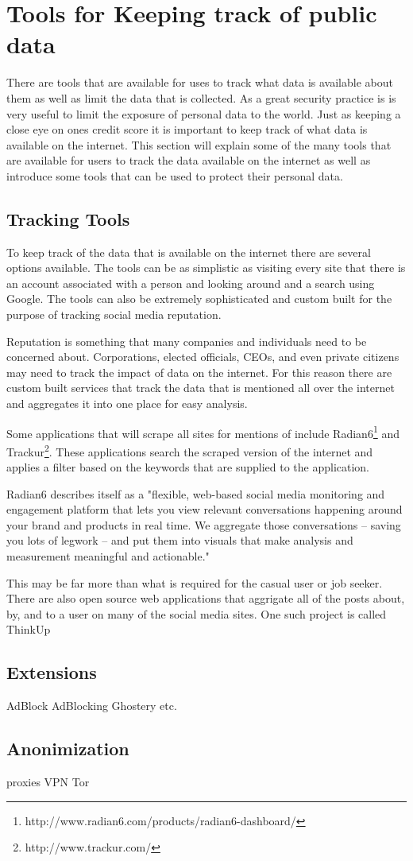 \section{Tools for Keeping track of public data}
There are tools that are available for uses to track what data is available about
them as well as limit the data that is collected. As a great security practice
is is very useful to limit the exposure of personal data to the world. Just as
keeping a close eye on ones credit score it is important to keep track of what
data is available on the internet. This section will explain some of the many
tools that are available for users to track the data available on the internet
as well as introduce some tools that can be used to protect their personal data.

\subsection{Tracking Tools}
To keep track of the data that is available on the internet there are several
options available. The tools can be as simplistic as visiting every site that
there is an account associated with a person and looking around and a search
using Google. The tools can also be extremely sophisticated and custom built for
the purpose of tracking social media reputation. 

Reputation is something that many companies and individuals need to be concerned
about. Corporations, elected officials, CEOs, and even private citizens may need
to track the impact of data on the internet. For this reason there are custom
built services that track the data that is mentioned all over the internet and
aggregates it into one place for easy analysis. 

Some applications that will scrape all sites for mentions of include
Radian6\footnote{http://www.radian6.com/products/radian6-dashboard/} and 
Trackur\footnote{http://www.trackur.com/}. These applications search the
scraped version of the internet and applies a filter based on the keywords that
are supplied to the application. 

Radian6 describes itself as a "flexible, web-based social media monitoring and 
engagement platform that lets you view relevant conversations happening around 
your brand and products in real time. We aggregate those conversations – saving 
you lots of legwork – and put them into visuals that make analysis and 
measurement meaningful and actionable."~\cite{Radian6}

This may be far more than what is required for the casual user or job seeker.
There are also open source web applications that aggrigate all of the posts
about, by, and to a user on many of the social media sites. One such project is
called ThinkUp

\subsection{Extensions}
AdBlock
AdBlocking 
Ghostery
etc.

\subsection{Anonimization}
proxies
VPN
Tor
